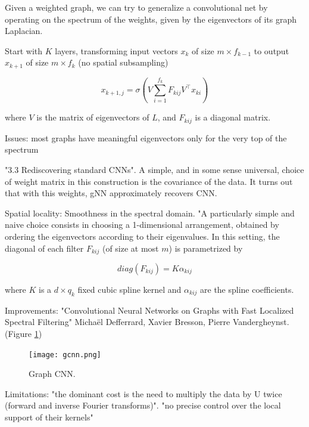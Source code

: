 \documentclass[english]{article}
\begin{document}
Given a weighted graph, we can try to
generalize a convolutional net by operating on the spectrum of the weights, given by the eigenvectors of its graph Laplacian.


\bitem 

\item Start with $K$ layers, transforming input vectors $x_k$ of size $m\times f_{k-1}$ to output $x_{k+1}$ of size $m\times f_{k}$ (no spatial subsampling)

$$
x_{k+1,j}
= \sigma 
(
V \sum_{i=1}^{f_k} F_{kij} V^\top x_{ki}
)
$$

where $V$ is the matrix of eigenvectors of $L$, and $F_{kij}$ is a diagonal matrix. 

\item Issues:  most graphs have meaningful eigenvectors only for
the very top of the spectrum
\eitem 

\item "3.3 Rediscovering standard CNNs". A simple, and in some sense universal, choice of weight matrix in this construction is the covariance
of the data. It turns out that with this weights, gNN approximately recovers CNN.


\item Spatial locality: Smoothness in the spectral domain. "A particularly simple and naive choice consists in choosing a 1-dimensional arrangement, obtained
by ordering the eigenvectors according to their eigenvalues.  In this setting, the diagonal of each filter
$F_{kij}$ (of size at most $m$) is parametrized by

$$diag(F_{kij}) = K\alpha_{kij}$$

where $K$ is a $d \times q_k$ fixed cubic spline kernel and $\alpha_{kij}$ are the spline coefficients.




\eitem 

\item Improvements: "Convolutional Neural Networks on Graphs
with Fast Localized Spectral Filtering" Michaël Defferrard, Xavier Bresson, Pierre Vandergheynst. (Figure \ref{gcnn})


\begin{figure}
  \centering
  \texttt{[image: gcnn.png]}
    \caption{Graph CNN.}
    \label{gcnn}
\end{figure}



\benum 
\item 
Limitations: "the dominant cost is the need
to multiply the data by U twice (forward and inverse Fourier transforms)". "no precise control over the
local support of their kernels"
\end{document}
